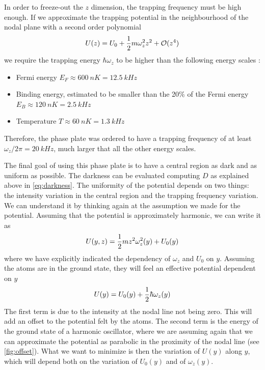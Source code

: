 In order to freeze-out the $z$ dimension, the trapping frequency must be high enough. If we approximate the trapping potential in the neighbourhood of the nodal plane with a second order polynomial
\begin{equation}
    \label{eq:trapping_frequency}
    U(z) = U_0 + \frac{1}{2} m \omega_z^2 z^2 + \mathcal{O}(z^4)
\end{equation}
we require the trapping energy $\hbar \omega_z$ to be higher than the following energy scales \cite{schmidt2021}:
\begin{itemize}
    \item Fermi energy $E_F \approx \SI{600}{nK} = \SI{12.5}{kHz}$
    \item Binding energy, estimated to be smaller than the 20\% of the Fermi energy $E_B \approx \SI{120}{nK} = \SI{2.5}{kHz}$
    \item Temperature $T \approx \SI{60}{nK} = \SI{1.3}{kHz}$
\end{itemize}
Therefore, the phase plate was ordered to have a trapping frequency of at least $\omega_z / 2\pi = \SI{20}{kHz}$, much larger that all the other energy scales.

The final goal of using this phase plate is to have a central region as dark and as uniform as possible. The darkness can be evaluated computing $D$ as explained above in \cref{eq:darkness}. The uniformity of the potential depends on two  things: the intensity variation in the central region and the trapping frequency variation. We can understand it by thinking again at the assumption we made for the potential.
Assuming that the potential is approximately harmonic, we can write it as
\begin{equation}
    U(y,z) = \frac{1}{2} m z^2\omega_z^2(y) + U_0(y)
\end{equation}
where we have explicitly indicated the dependency of $\omega_z$ and $U_0$ on $y$. Assuming the atoms are in the ground state, they will feel an effective potential dependent on $y$
\begin{equation}
    \label{eq:effectivr_potential}
    U(y) = U_0(y) + \frac{1}{2} \hbar \omega_z(y)
\end{equation}
The first term is due to the intensity at the nodal line not being zero. This will add an offset to the potential felt by the atoms. The second term is the energy of the ground state of a harmonic oscillator, where we are assuming again that we can approximate the potential as parabolic in the proximity of the nodal line (see \cref{fig:offset}). What we want to minimize is then the variation of $U(y)$ along $y$, which will depend both on the variation of $U_0(y)$ and of  $\omega_z(y)$.

